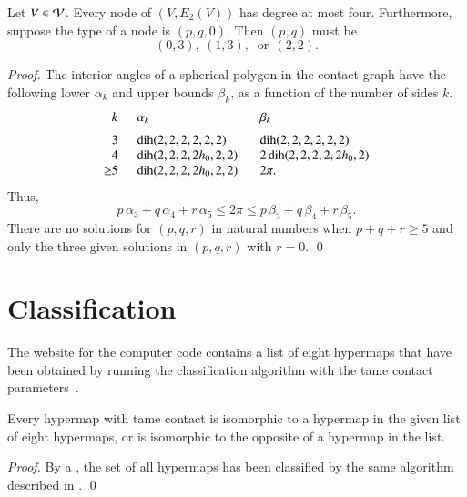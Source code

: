 \documentclass{llncs}
\def\op#1{{\hbox{#1}}}
\begin{document}
\begin{lemma}\label{lemma:no-5} 
  Let $V\in {\mathcal V}$.  Every node of $(V,E_2(V))$ has degree at most
  four.  Furthermore, suppose the type of a node is $(p,q,0)$.  Then
  $(p,q)$ must be
\[
(0,3),~(1,3),~\text{ or}~~(2,2).
\]
\end{lemma}

\begin{proof} The interior angles of a spherical polygon in the
  contact graph have the following lower $\alpha_k$ and upper bounds
  $\beta_k$, as a function of the number of sides $k$.
\begin{equation}
\begin{array}{lllll}
  \phantom{\ge}k~~&\alpha_k & \beta_k \vspace{6pt}\\
  \phantom{\ge}3~~&\op{dih}(2,2,2,2,2,2)  &\op{dih}(2,2,2,2,2,2)\\
  \phantom{\ge}4~~&\op{dih}(2,2,2,2h_0,2,2) &2\,\op{dih}(2,2,2,2,2h_0,2)\\
  {\ge}5~~& \op{dih}(2,2,2,2h_0,2,2) ~~~& 2\pi.
\end{array}
\end{equation}
Thus,
\[
  p\,\alpha_3 + q\,\alpha_4 +r\, \alpha_5 
\le 2\pi \le p\,\beta_3 + q\,\beta_4 + r \,\beta_5.
\]
There are no solutions for
$(p,q,r)$ in natural numbers when $p+q+r\ge 5$ and
 only the three given solutions in $(p,q,r)$ with $r=0$.
\qed\end{proof}



\section{Classification}

The website for the computer code  contains a list of eight hypermaps
that have been obtained by running the classification algorithm with
the tame contact parameters~\cite{website:FlyspeckProject}.

\begin{lemma}\cutrate{}
  \label{lemma:contact-classification} Every hypermap with tame
  contact is isomorphic to a hypermap in the given list of eight
  hypermaps, or is isomorphic to the opposite of a hypermap in the
  list.  %
\end{lemma}

\begin{proof}
  By a , %
 the set of all hypermaps has been classified by the same
  algorithm described in \cite[Chapter~4]{DSP}.
\qed\end{proof}
\end{document}
